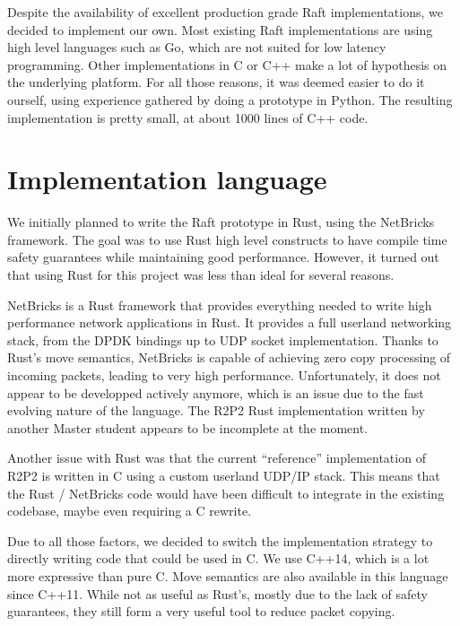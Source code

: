 Despite the availability of excellent production grade Raft implementations, we decided to implement our own.
Most existing Raft implementations are using high level languages such as Go, which are not suited for low latency programming.
Other implementations in C or C++ make a lot of hypothesis on the underlying platform.
For all those reasons, it was deemed easier to do it ourself, using experience gathered by doing a prototype in Python.
The resulting implementation is pretty small, at about 1000 lines of C++ code.

\section{Implementation language}

We initially planned to write the Raft prototype in Rust, using the NetBricks\cite{netbricks} framework.
The goal was to use Rust high level constructs to have compile time safety guarantees while maintaining good performance.
However, it turned out that using Rust for this project was less than ideal for several reasons.

NetBricks\cite{netbricks} is a Rust framework that provides everything needed to write high performance network applications in Rust.  %
It provides a full userland networking stack, from the DPDK bindings up to UDP socket implementation.
Thanks to Rust's move semantics, NetBricks is capable of achieving zero copy processing of incoming packets, leading to very high performance.
Unfortunately, it does not appear to be developped actively anymore, which is an issue due to the fast evolving nature of the language.
The R2P2 Rust implementation\cite{ogier} written by another Master student appears to be incomplete at the moment.

Another issue with Rust was that the current ``reference'' implementation of R2P2 is written in C using a custom userland UDP/IP stack.
This means that the Rust / NetBricks code would have been difficult to integrate in the existing codebase, maybe even requiring a C rewrite.

Due to all those factors, we decided to switch the implementation strategy to directly writing code that could be used in C.
We use C++14, which is a lot more expressive than pure C.
Move semantics are also available in this language since C++11.
While not as useful as Rust's, mostly due to the lack of safety guarantees, they still form a very useful tool to reduce packet copying.

